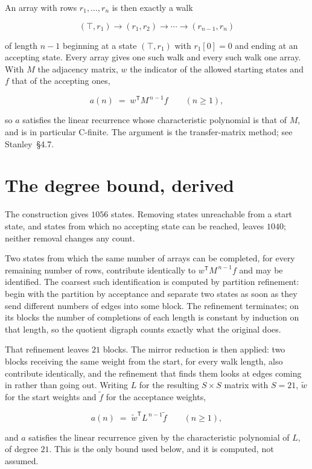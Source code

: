 \documentclass[11pt]{article}
\theoremstyle{definition}
\begin{document}
An array with rows $r_1,\dots,r_n$ is then exactly a walk

\[(\top,r_1) \to (r_1,r_2) \to \cdots \to (r_{n-1},r_n)\]

of length $n-1$ beginning at a state $(\top,r_1)$ with $r_1[0]=0$ and ending at an accepting state. Every array gives one such walk and every such walk one array. With $M$ the adjacency matrix, $w$ the indicator of the allowed starting states and $f$ that of the accepting ones,

\[a(n) \;=\; w^{\mathsf T} M^{\,n-1} f \qquad (n \ge 1),\]

so $a$ satisfies the linear recurrence whose characteristic polynomial is that of $M$, and is in particular C-finite. The argument is the transfer-matrix method; see Stanley~\S4.7.

\section{The degree bound, derived}

The construction gives $1056$ states. Removing states unreachable from a start state, and states from which no accepting state can be reached, leaves $1040$; neither removal changes any count.

Two states from which the same number of arrays can be completed, for every remaining number of rows, contribute identically to $w^{\mathsf T}M^{\,n-1}f$ and may be identified. The coarsest such identification is computed by partition refinement: begin with the partition by acceptance and separate two states as soon as they send different numbers of edges into some block. The refinement terminates; on its blocks the number of completions of each length is constant by induction on that length, so the quotient digraph counts exactly what the original does.

That refinement leaves $21$ blocks. The mirror reduction is then applied: two blocks receiving the same weight from the start, for every walk length, also contribute identically, and the refinement that finds them looks at edges coming in rather than going out. Writing $L$ for the resulting $S \times S$ matrix with $S = 21$, $\tilde w$ for the start weights and $\tilde f$ for the acceptance weights,

\[a(n) \;=\; \tilde w^{\mathsf T} L^{\,n-1} \tilde f \qquad (n \ge 1),\]

and $a$ satisfies the linear recurrence given by the characteristic polynomial of $L$, of degree $21$. This is the only bound used below, and it is computed, not assumed.
\end{document}
